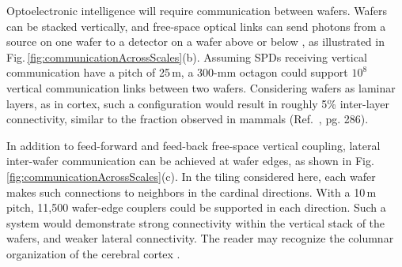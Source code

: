 \documentclass[twocolumn]{article}
\newcommand{\onlinecite}[1]{\hspace{-1 ex} \nocite{#1}\citenum{#1}}
\begin{document}
\begin{figure}[tb]
\end{figure}
Optoelectronic intelligence will require communication between wafers. Wafers can be stacked vertically, and free-space optical links can send photons from a source on one wafer to a detector on a wafer above or below \cite{caga2012}, as illustrated in Fig.\,\ref{fig:communicationAcrossScales}(b). Assuming SPDs receiving vertical communication have a pitch of 25\,\textmu m, a 300-mm octagon could support $10^8$ vertical communication links between two wafers. Considering wafers as laminar layers, as in cortex, such a configuration would result in roughly 5\% inter-layer connectivity, similar to the fraction observed in mammals (Ref.\,\onlinecite{bu2006}, pg. 286).

In addition to feed-forward and feed-back free-space vertical coupling, lateral inter-wafer communication can be achieved at wafer edges, as shown in Fig.\,\ref{fig:communicationAcrossScales}(c). In the tiling considered here, each wafer makes such connections to neighbors in the cardinal directions. With a 10\,\textmu m pitch, 11,500 wafer-edge couplers could be supported in each direction. Such a system would demonstrate strong connectivity within the vertical stack of the wafers, and weaker lateral connectivity. The reader may recognize the columnar organization of the cerebral cortex \cite{mo1997}.
\end{document}
